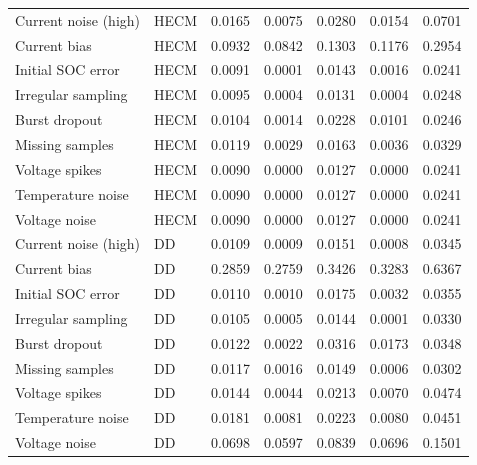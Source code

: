 \documentclass[
    a4paper,
    12pt,
    titlepage,
    bibliography=totoc,
    twoside=on,
    parskip=false,
    numbers=noenddot,
    cleardoublepage=empty,
    DIV=12,
    BCOR=12.0mm,
    headheight=36pt,
    headings=openright
]{scrreprt}
\begin{document}
\begin{longtable}{p{2.4cm}p{1.3cm}rrrrr}
Current noise (high) & HECM & 0.0165 & 0.0075 & 0.0280 & 0.0154 & 0.0701 \\
Current bias & HECM & 0.0932 & 0.0842 & 0.1303 & 0.1176 & 0.2954 \\
Initial SOC error & HECM & 0.0091 & 0.0001 & 0.0143 & 0.0016 & 0.0241 \\
Irregular sampling & HECM & 0.0095 & 0.0004 & 0.0131 & 0.0004 & 0.0248 \\
Burst dropout & HECM & 0.0104 & 0.0014 & 0.0228 & 0.0101 & 0.0246 \\
Missing samples & HECM & 0.0119 & 0.0029 & 0.0163 & 0.0036 & 0.0329 \\
Voltage spikes & HECM & 0.0090 & 0.0000 & 0.0127 & 0.0000 & 0.0241 \\
Temperature noise & HECM & 0.0090 & 0.0000 & 0.0127 & 0.0000 & 0.0241 \\
Voltage noise & HECM & 0.0090 & 0.0000 & 0.0127 & 0.0000 & 0.0241 \\
Current noise (high) & DD & 0.0109 & 0.0009 & 0.0151 & 0.0008 & 0.0345 \\
Current bias & DD & 0.2859 & 0.2759 & 0.3426 & 0.3283 & 0.6367 \\
Initial SOC error & DD & 0.0110 & 0.0010 & 0.0175 & 0.0032 & 0.0355 \\
Irregular sampling & DD & 0.0105 & 0.0005 & 0.0144 & 0.0001 & 0.0330 \\
Burst dropout & DD & 0.0122 & 0.0022 & 0.0316 & 0.0173 & 0.0348 \\
Missing samples & DD & 0.0117 & 0.0016 & 0.0149 & 0.0006 & 0.0302 \\
Voltage spikes & DD & 0.0144 & 0.0044 & 0.0213 & 0.0070 & 0.0474 \\
Temperature noise & DD & 0.0181 & 0.0081 & 0.0223 & 0.0080 & 0.0451 \\
Voltage noise & DD & 0.0698 & 0.0597 & 0.0839 & 0.0696 & 0.1501 \\
\bottomrule
\end{longtable}
\end{document}
